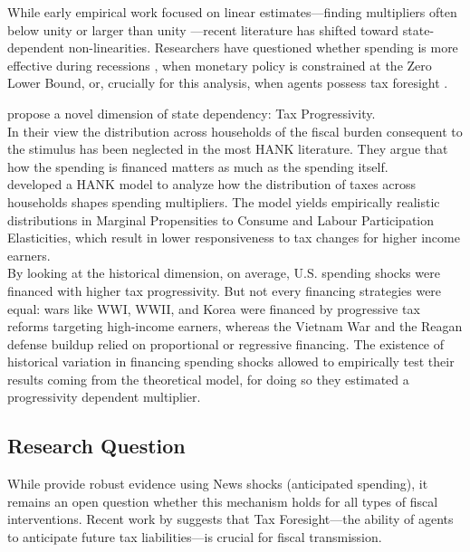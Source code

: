 \documentclass[12pt,letterpaper]{article}
\begin{document}
While early empirical work focused on linear estimates—finding multipliers often below unity \cite{RameyShapiro98, Ramey2011} or larger than unity \cite{BP}—recent literature has shifted toward state-dependent non-linearities. Researchers have questioned whether spending is more effective during recessions \citep{Auerbach_Gorodnichenko_2012_Measuring, CaggianoCastelnuovo_NonLinear, RameyZubairy2018}, when monetary policy is constrained at the Zero Lower Bound, or, crucially for this analysis, when agents possess tax foresight \citep{Ascari}.


\cite{FN} propose a novel dimension of state dependency: Tax Progressivity.
\\
In their view the distribution across households of the fiscal burden consequent to the stimulus has been neglected in the most HANK literature.
They argue that how the spending is financed matters as much as the spending itself. 
\\
\cite{FN} developed a HANK model to analyze how the distribution of taxes across households shapes spending multipliers.
The model yields empirically realistic distributions in Marginal Propensities to Consume and Labour Participation Elasticities, which result in lower responsiveness to tax changes for higher income earners.
\\
By looking at the historical dimension, on average, U.S. spending shocks were financed with higher tax progressivity.
But not every financing strategies were equal: wars like WWI, WWII, and Korea were financed by progressive tax reforms targeting high-income earners, whereas the Vietnam War and the Reagan defense buildup relied on proportional or regressive financing. The existence of historical variation in financing spending shocks allowed \cite{FN} to empirically test their results coming from the theoretical model, for doing so they estimated a progressivity dependent multiplier.



\subsection{Research Question}
While \cite{FN} provide robust evidence using News shocks (anticipated spending), it remains an open question whether this mechanism holds for all types of fiscal interventions. Recent work by \cite{Ascari} suggests that Tax Foresight—the ability of agents to anticipate future tax liabilities—is crucial for fiscal transmission.
\end{document}

